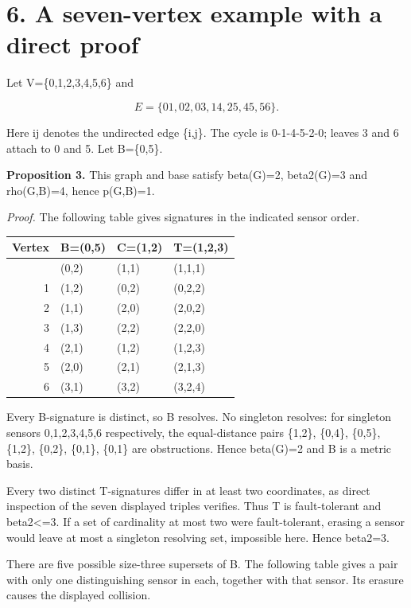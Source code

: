 \documentclass[
]{article}
\newcounter{none} %
\begin{document}
\section{6. A seven-vertex example with a direct
proof}\label{a-seven-vertex-example-with-a-direct-proof}

Let V=\{0,1,2,3,4,5,6\} and

\[E=\{01,02,03,14,25,45,56\}.\]

Here ij denotes the undirected edge \{i,j\}. The cycle is 0-1-4-5-2-0;
leaves 3 and 6 attach to 0 and 5. Let B=\{0,5\}.

\textbf{Proposition 3.} This graph and base satisfy beta(G)=2,
beta2(G)=3 and rho(G,B)=4, hence p(G,B)=1.

\emph{Proof.} The following table gives signatures in the indicated
sensor order.

{\def\LTcaptype{none} %
\begin{longtable}[]{@{}rlll@{}}
\toprule\noalign{}
Vertex & B=(0,5) & C=(1,2) & T=(1,2,3) \\
\midrule\noalign{}
\endhead
\bottomrule\noalign{}
\endlastfoot
0 & (0,2) & (1,1) & (1,1,1) \\
1 & (1,2) & (0,2) & (0,2,2) \\
2 & (1,1) & (2,0) & (2,0,2) \\
3 & (1,3) & (2,2) & (2,2,0) \\
4 & (2,1) & (1,2) & (1,2,3) \\
5 & (2,0) & (2,1) & (2,1,3) \\
6 & (3,1) & (3,2) & (3,2,4) \\
\end{longtable}
}

Every B-signature is distinct, so B resolves. No singleton resolves: for
singleton sensors 0,1,2,3,4,5,6 respectively, the equal-distance pairs
\{1,2\}, \{0,4\}, \{0,5\}, \{1,2\}, \{0,2\}, \{0,1\}, \{0,1\} are
obstructions. Hence beta(G)=2 and B is a metric basis.

Every two distinct T-signatures differ in at least two coordinates, as
direct inspection of the seven displayed triples verifies. Thus T is
fault-tolerant and beta2\textless=3. If a set of cardinality at most two
were fault-tolerant, erasing a sensor would leave at most a singleton
resolving set, impossible here. Hence beta2=3.

There are five possible size-three supersets of B. The following table
gives a pair with only one distinguishing sensor in each, together with
that sensor. Its erasure causes the displayed collision.
\end{document}
